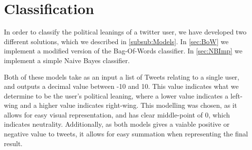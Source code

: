\chapter{Classification}\label{cha:classification}

In order to classify the political leanings of a twitter user, we have developed
two different solutions, which we described in \autoref{subsub:Models}. In
\autoref{sec:BoW} we implement a modified version of the Bag-Of-Words
classifier. In \autoref{sec:NBImp} we implement a simple Naive Bayes
classifier.\nl

Both of these models take as an input a list of Tweets relating to a single
user, and outputs a decimal value between -10 and 10. This value indicates
what we determine to be the user's political leaning, where a lower value
indicates a left-wing and a higher value indicates right-wing. This modelling
was chosen, as it allows for easy visual representation, and has clear
middle-point of 0, which indicates neutrality. Additionally, as both
models gives a vaiable positive or negative value to tweets, it allows for easy
summation when representing the final result.
